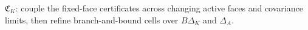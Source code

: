 \(\mathfrak C_K\): couple the fixed-face certificates across changing active faces and covariance limits, then refine branch-and-bound cells over \(B\Delta_K\) and \(\Delta_A\).